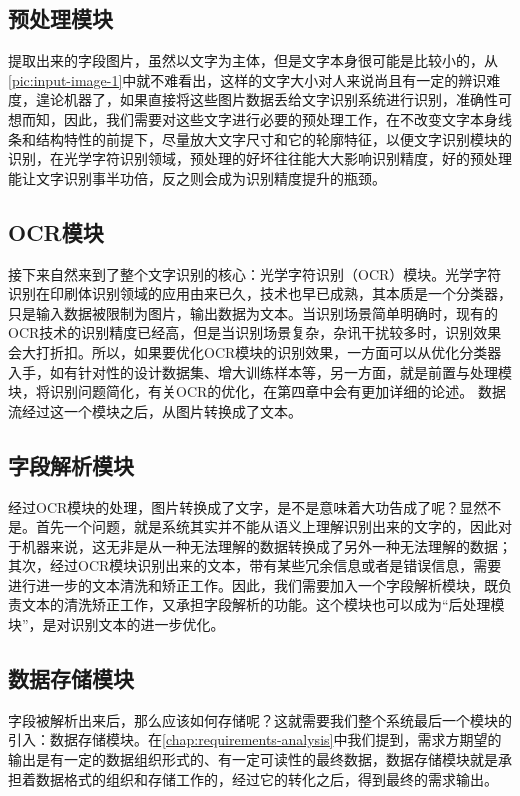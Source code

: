 \subsection{预处理模块}
提取出来的字段图片，虽然以文字为主体，但是文字本身很可能是比较小的，从\autoref{pic:input-image-1}中就不难看出，这样的文字大小对人来说尚且有一定的辨识难度，遑论机器了，如果直接将这些图片数据丢给文字识别系统进行识别，准确性可想而知，因此，我们需要对这些文字进行必要的预处理工作，在不改变文字本身线条和结构特性的前提下，尽量放大文字尺寸和它的轮廓特征，以便文字识别模块的识别，在光学字符识别领域，预处理的好坏往往能大大影响识别精度，好的预处理能让文字识别事半功倍，反之则会成为识别精度提升的瓶颈。

\subsection{OCR模块}
接下来自然来到了整个文字识别的核心：光学字符识别（OCR）模块。光学字符识别在印刷体识别领域的应用由来已久\citep{impedovo1991optical}，技术也早已成熟，其本质是一个分类器，只是输入数据被限制为图片，输出数据为文本。当识别场景简单明确时，现有的OCR技术的识别精度已经高，但是当识别场景复杂，杂讯干扰较多时，识别效果会大打折扣。所以，如果要优化OCR模块的识别效果，一方面可以从优化分类器入手，如有针对性的设计数据集、增大训练样本等，另一方面，就是前置与处理模块，将识别问题简化，有关OCR的优化，在第四章中会有更加详细的论述。
数据流经过这一个模块之后，从图片转换成了文本。

\subsection{字段解析模块}
经过OCR模块的处理，图片转换成了文字，是不是意味着大功告成了呢？显然不是。首先一个问题，就是系统其实并不能从语义上理解识别出来的文字的，因此对于机器来说，这无非是从一种无法理解的数据转换成了另外一种无法理解的数据；其次，经过OCR模块识别出来的文本，带有某些冗余信息或者是错误信息，需要进行进一步的文本清洗和矫正工作。因此，我们需要加入一个字段解析模块，既负责文本的清洗矫正工作，又承担字段解析的功能。这个模块也可以成为“后处理模块”，是对识别文本的进一步优化。

\subsection{数据存储模块}
字段被解析出来后，那么应该如何存储呢？这就需要我们整个系统最后一个模块的引入：数据存储模块。在\autoref{chap:requirements-analysis}中我们提到，需求方期望的输出是有一定的数据组织形式的、有一定可读性的最终数据，数据存储模块就是承担着数据格式的组织和存储工作的，经过它的转化之后，得到最终的需求输出。

